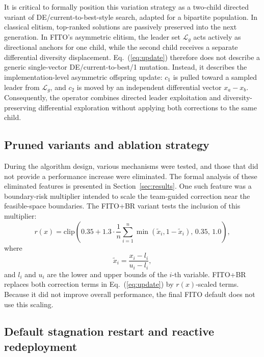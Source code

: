 \documentclass[preprint,12pt]{elsarticle}
\begin{document}
It is critical to formally position this variation strategy as a two-child directed variant of DE/current-to-best-style search, adapted for a bipartite population. In classical elitism, top-ranked solutions are passively preserved into the next generation. In FITO's asymmetric elitism, the leader set $\mathcal{L}_g$ acts actively as directional anchors for one child, while the second child receives a separate differential diversity displacement. Eq.~(\ref{eq:update}) therefore does not describe a generic single-vector DE/current-to-best/1 mutation. Instead, it describes the implementation-level asymmetric offspring update: $c_1$ is pulled toward a sampled leader from $\mathcal{L}_g$, and $c_2$ is moved by an independent differential vector $x_a-x_b$. Consequently, the operator combines directed leader exploitation and diversity-preserving differential exploration without applying both corrections to the same child.
\subsection{Pruned variants and ablation strategy}

During the algorithm design, various mechanisms were tested, and those that did not provide a performance increase were eliminated. The formal analysis of these eliminated features is presented in Section~\ref{sec:results}. One such feature was a boundary-risk multiplier intended to scale the team-guided correction near the feasible-space boundaries. The FITO+BR variant tests the inclusion of this multiplier:
\begin{equation}
r(x) = \mathrm{clip}\left(0.35 + 1.3 \cdot \frac{1}{n}\sum_{i=1}^{n}\min(\tilde{x}_i, 1-\tilde{x}_i),\,0.35,\,1.0\right),
\label{eq:risk}
\end{equation}
where
\begin{equation}
\tilde{x}_i = \frac{x_i-l_i}{u_i-l_i},
\end{equation}
and $l_i$ and $u_i$ are the lower and upper bounds of the $i$-th variable. FITO+BR replaces both correction terms in Eq.~(\ref{eq:update}) by $r(x)$-scaled terms. Because it did not improve overall performance, the final FITO default does not use this scaling.

\subsection{Default stagnation restart and reactive redeployment}
\end{document}
